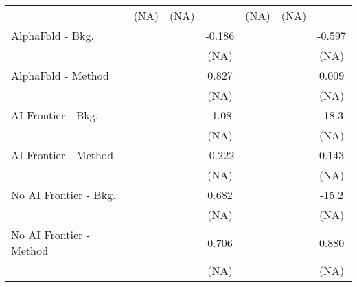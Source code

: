\begin{tabular}{lcccccc}
                                                                              & (NA)                   & (NA)   &        & (NA)                   & (NA)   &   \\   
   AlphaFold - Bkg.                                                           &                        &        & -0.186 &                        &        & -0.597\\   
                                                                              &                        &        & (NA)   &                        &        & (NA)\\   
   AlphaFold - Method                                                         &                        &        & 0.827  &                        &        & 0.009\\   
                                                                              &                        &        & (NA)   &                        &        & (NA)\\   
   AI Frontier - Bkg.                                                         &                        &        & -1.08  &                        &        & -18.3\\   
                                                                              &                        &        & (NA)   &                        &        & (NA)\\   
   AI Frontier - Method                                                       &                        &        & -0.222 &                        &        & 0.143\\   
                                                                              &                        &        & (NA)   &                        &        & (NA)\\   
   No AI Frontier - Bkg.                                                      &                        &        & 0.682  &                        &        & -15.2\\   
                                                                              &                        &        & (NA)   &                        &        & (NA)\\   
   No AI Frontier - Method                                                    &                        &        & 0.706  &                        &        & 0.880\\   
                                                                              &                        &        & (NA)   &                        &        & (NA)\\   

\end{tabular}
